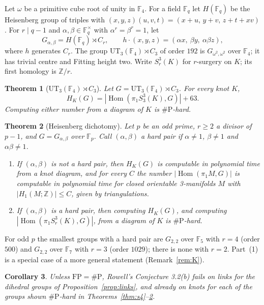 \documentclass[11pt]{article}
\newtheorem{theorem}{Theorem}
\newtheorem{corollary}[theorem]{Corollary}
\theoremstyle{definition}
\theoremstyle{remark}
\newcommand{\F}{\mathbb{F}}
\newcommand{\Z}{\mathbb{Z}}
\newcommand{\Hom}{\operatorname{Hom}}
\newcommand{\sharpP}{\#\mathrm{P}}
\newcommand{\FP}{\mathrm{FP}}
\begin{document}
Let $\omega$ be a primitive cube root of unity in $\F_4$. For a field $\F_q$
let $H(\F_q)$ be the Heisenberg group of triples with
$(x,y,z)(u,v,t)=(x+u,\,y+v,\,z+t+xv)$. For $r\mid q-1$ and
$\alpha,\beta\in\F_q^\times$ with $\alpha^r=\beta^r=1$, let
\[
G_{\alpha,\beta}=H(\F_q)\rtimes C_r,\qquad h\cdot(x,y,z)=(\alpha x,\ \beta y,\
\alpha\beta z),
\]
where $h$ generates $C_r$. The group $\mathrm{UT}_3(\F_4)\rtimes C_3$ of order
$192$ is $G_{\omega^2,\omega^2}$ over $\F_4$; it has trivial centre and Fitting
height two. Write $S^3_r(K)$ for $r$-surgery on $K$; its first homology is
$\Z/r$.

\begin{theorem}[$\mathrm{UT}_3(\F_4)\rtimes C_3$]\label{thm:ut3}
Let $G=\mathrm{UT}_3(\F_4)\rtimes C_3$. For every knot $K$,
\[
H_K(G)=|\Hom(\pi_1S^3_3(K),G)|+63.
\]
Computing either number from a diagram of $K$ is $\sharpP$-hard.
\end{theorem}

\begin{theorem}[Heisenberg dichotomy]\label{thm:heis}
Let $p$ be an odd prime, $r\ge2$ a divisor of $p-1$, and $G=G_{\alpha,\beta}$
over $\F_p$. Call $(\alpha,\beta)$ a \emph{hard pair} if $\alpha\ne1$,
$\beta\ne1$ and $\alpha\beta\ne1$.
\begin{enumerate}
\item If $(\alpha,\beta)$ is not a hard pair, then $H_K(G)$ is computable in
polynomial time from a knot diagram, and for every $C$ the number
$|\Hom(\pi_1M,G)|$ is computable in polynomial time for closed orientable
3-manifolds $M$ with $|H_1(M;\Z)|\le C$, given by triangulations.
\item If $(\alpha,\beta)$ is a hard pair, then computing $H_K(G)$, and
computing $|\Hom(\pi_1S^3_r(K),G)|$, from a diagram of $K$ is $\sharpP$-hard.
\end{enumerate}
\end{theorem}

For odd $p$ the smallest groups with a hard pair are $G_{2,2}$ over $\F_5$ with
$r=4$ (order $500$) and $G_{2,2}$ over $\F_7$ with $r=3$ (order $1029$); there is
none with $r=2$. Part~(1) is a special case of a more general statement
(Remark~\ref{rem:K}).

\begin{corollary}\label{cor:rowell}
Unless $\FP=\sharpP$, Rowell's Conjecture 3.2(b) fails on links for the
dihedral groups of Proposition~\ref{prop:links}, and already on knots for each of
the groups shown $\sharpP$-hard in Theorems~\ref{thm:s4}--\ref{thm:heis}.
\end{corollary}
\end{document}
